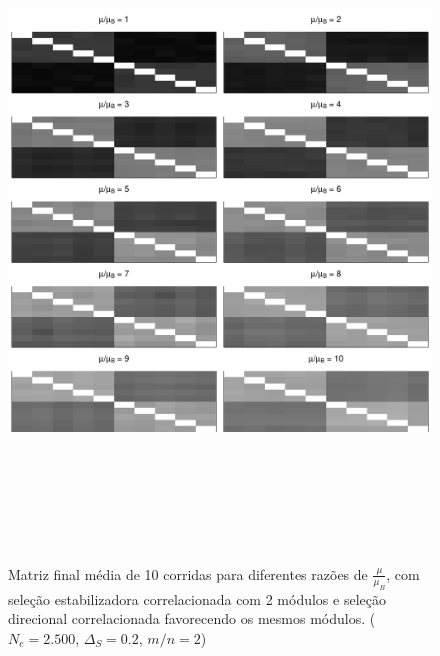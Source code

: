 \begin{figure}[htbp]
    \centering
    \includegraphics[width=150mm, height=180mm]{figuras/MatBDirecRMu}
    \caption{Matriz final média de 10 corridas para diferentes razões de
        $\frac{\mu}{\mu_B}$, com seleção estabilizadora correlacionada com 2
        módulos e seleção direcional correlacionada favorecendo os mesmos
    módulos. ($N_e=2.500$, $\Delta_S=0.2$, $m/n=2$)}
    \label{MatBDirecional-RMu}
\end{figure}



